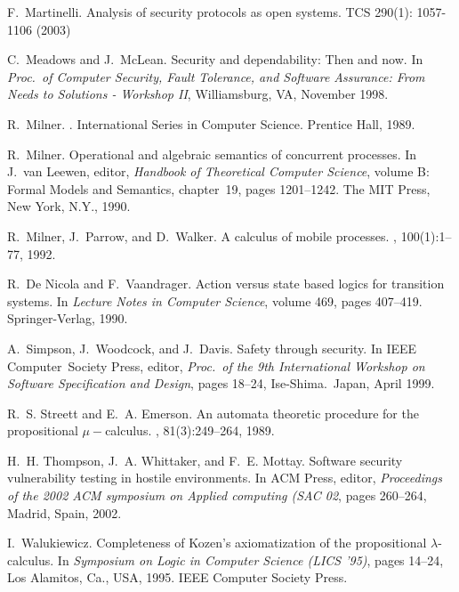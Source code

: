 \documentclass{entcs}
\begin{document}
\begin{thebibliography}{10}
 F.~Martinelli.  \newblock Analysis of security protocols as
  open systems.  \newblock TCS 290(1): 1057-1106 (2003)

 C.~Meadows and J.~McLean.  \newblock Security and
  dependability: Then and now.  \newblock In {\em Proc.~of Computer Security,
    Fault Tolerance, and Software Assurance: From Needs to Solutions -
    Workshop II}, Williamsburg, VA, November 1998.

 R.~Milner.  .
  \newblock International Series in Computer Science. Prentice Hall, 1989.

 R.~Milner.  \newblock Operational and algebraic semantics
  of concurrent processes.  \newblock In J.~van Leewen, editor, {\em Handbook
    of Theoretical Computer Science}, volume B: Formal Models and Semantics,
  chapter~19, pages 1201--1242. The MIT Press, New York, N.Y., 1990.

 R.~Milner, J.~Parrow, and D.~Walker.  \newblock A
  calculus of mobile processes.  ,
  100(1):1--77, 1992.

 R.~De Nicola and F.~Vaandrager.  \newblock Action versus
  state based logics for transition systems.  \newblock In {\em Lecture Notes
    in Computer Science}, volume 469, pages 407--419. Springer-Verlag, 1990.

 A.~Simpson, J.~Woodcock, and J.~Davis.  \newblock Safety
  through security.  \newblock In IEEE Computer~Society Press, editor, {\em
    Proc.~of the 9th International Workshop on Software Specification and
    Design}, pages 18--24, Ise-Shima.~Japan, April 1999.

 R.~S. Streett and E.~A. Emerson.  \newblock An automata
  theoretic procedure for the propositional $\mu-$calculus.  , 81(3):249--264, 1989.

 H.~H. Thompson, J.~A. Whittaker, and F.~E. Mottay.
  \newblock Software security vulnerability testing in hostile environments.
  \newblock In ACM Press, editor, {\em Proceedings of the 2002 ACM symposium
    on Applied computing (SAC 02}, pages 260--264, Madrid, Spain, 2002.

 I.~Walukiewicz.  \newblock Completeness of {K}ozen's
  axiomatization of the propositional {$\lambda$}-calculus.  \newblock In {\em
    Symposium on Logic in Computer Science ({LICS} '95)}, pages 14--24, Los
  Alamitos, Ca., USA, 1995. IEEE Computer Society Press.

\end{thebibliography}
\end{document}
